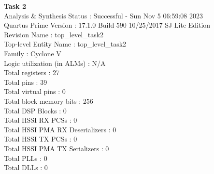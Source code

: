 \documentclass[11pt, titlepage]{article}
\begin{document}
\begin{description}
                \newpage
                \item \textbf{Task 2} \\
                    Analysis \& Synthesis Status : Successful - Sun Nov  5 06:59:08 2023 \\
                    Quartus Prime Version : 17.1.0 Build 590 10/25/2017 SJ Lite Edition \\
                    Revision Name : top\_level\_task2 \\
                    Top-level Entity Name : top\_level\_task2 \\
                    Family : Cyclone V \\
                    Logic utilization (in ALMs) : N/A \\
                    Total registers : 27 \\
                    Total pins : 39 \\
                    Total virtual pins : 0 \\
                    Total block memory bits : 256 \\
                    Total DSP Blocks : 0 \\
                    Total HSSI RX PCSs : 0 \\
                    Total HSSI PMA RX Deserializers : 0 \\
                    Total HSSI TX PCSs : 0 \\
                    Total HSSI PMA TX Serializers : 0 \\
                    Total PLLs : 0 \\
                    Total DLLs : 0 \\


\end{description}
\end{document}
